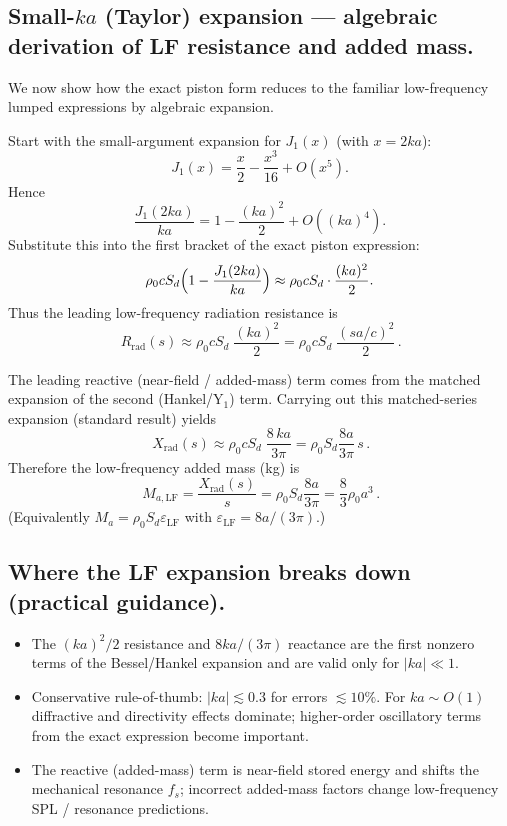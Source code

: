 \subsection{Small-\(ka\) (Taylor) expansion — algebraic derivation of LF resistance and added mass.}
We now show how the exact piston form reduces to the familiar low-frequency lumped expressions by algebraic expansion.

Start with the small-argument expansion for \(J_1(x)\) (with \(x=2ka\)):
\[
J_1(x)=\frac{x}{2}-\frac{x^3}{16}+O(x^5).
\]
Hence
\[
\frac{J_1(2ka)}{ka}=1-\frac{(ka)^2}{2}+O((ka)^4).
\]
Substitute this into the first bracket of the exact piston expression:
\[
\rho_0 c S_d\Bigl(1-\frac{J_1(2ka)}{ka}\Bigr)\approx \rho_0 c S_d\cdot\frac{(ka)^2}{2}.
\]
Thus the leading low-frequency radiation resistance is
\[
\boxed{\,R_{\mathrm{rad}}(s)\approx \rho_0 c S_d\;\frac{(ka)^2}{2}
=\rho_0 c S_d\;\frac{(s a / c)^2}{2}\,.}
\]

The leading reactive (near-field / added-mass) term comes from the matched expansion of the second (Hankel/Y\(_1\)) term. Carrying out this matched-series expansion (standard result) yields
\[
\boxed{\,X_{\mathrm{rad}}(s)\approx \rho_0 c S_d\;\frac{8\,ka}{3\pi}
=\rho_0 S_d\frac{8 a}{3\pi}\,s\,.}
\]
Therefore the low-frequency added mass (kg) is
\[
\boxed{\,M_{a,\mathrm{LF}}=\frac{X_{\mathrm{rad}}(s)}{s}
=\rho_0 S_d\frac{8 a}{3\pi}
=\frac{8}{3}\rho_0 a^3\,.}
\]
(Equivalently \(M_a=\rho_0 S_d \varepsilon_{\mathrm{LF}}\) with \(\varepsilon_{\mathrm{LF}}=8a/(3\pi)\).)

\subsection{Where the LF expansion breaks down (practical guidance).}
\begin{itemize}
  \item The \((ka)^2/2\) resistance and \(8ka/(3\pi)\) reactance are the first nonzero terms of the Bessel/Hankel expansion and are valid only for \(|ka|\ll1\).  
  \item Conservative rule-of-thumb: \(|ka|\lesssim 0.3\) for errors \(\lesssim 10\%\). For \(ka\sim O(1)\) diffractive and directivity effects dominate; higher-order oscillatory terms from the exact expression become important.  
  \item The reactive (added-mass) term is near-field stored energy and shifts the mechanical resonance \(f_s\); incorrect added-mass factors change low-frequency SPL / resonance predictions.
\end{itemize}

